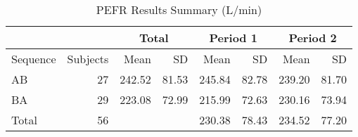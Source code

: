 \begin{table}
\centering
\caption{PEFR Results Summary (L/min)}
\centering
\begin{tabular}[t]{l|r|r|r|r|r|r|r}
\multicolumn{2}{c|}{} &
\multicolumn{2}{|c|}{Total} &
\multicolumn{2}{|c|}{Period 1} &
\multicolumn{2}{|c}{Period 2} \\
\hline
Sequence & Subjects & Mean & SD & Mean & SD & Mean & SD \\
\hline
AB & 27 & 242.52 & 81.53 & 245.84 & 82.78 & 239.20 & 81.70\\
\hline
BA & 29 & 223.08 & 72.99 & 215.99 & 72.63 & 230.16 & 73.94\\
\hline
\hline
Total & 56 & & & 230.38 & 78.43 & 234.52 & 77.20\\
\hline
\end{tabular}
\end{table}
